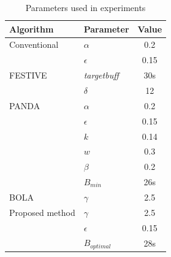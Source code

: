 \documentclass[journal]{IEEEtran}
\begin{document}
\begin{center}
    

\begin{table}[!h]

    \caption{Parameters used in experiments}
    \label{parameters}
    \centering
	\begin{tabular}{|l|l|c|} 
		\hline
		Algorithm & Parameter & Value \\  
		\hline\hline
		Conventional & $\alpha$ & 0.2\\
		& $\epsilon$ & 0.15 \\
		\hline
		FESTIVE & \textit{targetbuff} & 30s \\ 
		& $\delta$ &12\\
		\hline 
		PANDA & $\alpha$ & 0.2\\
				& $\epsilon$ & 0.15 \\
						& $k$ & 0.14 \\
						& $w$ & 0.3 \\
						& $\beta$ & 0.2 \\
						& $B_{min}$ & 26s\\
		
		
		\hline
		BOLA & $\gamma$ & 2.5\\
		\hline
		Proposed method & $\gamma$ & 2.5\\
		& $\epsilon$ & 0.15 \\
		& $B_{optimal}$ & 28s\\
		\hline
	
	\end{tabular}

\end{table}
\end{center}
\end{document}
